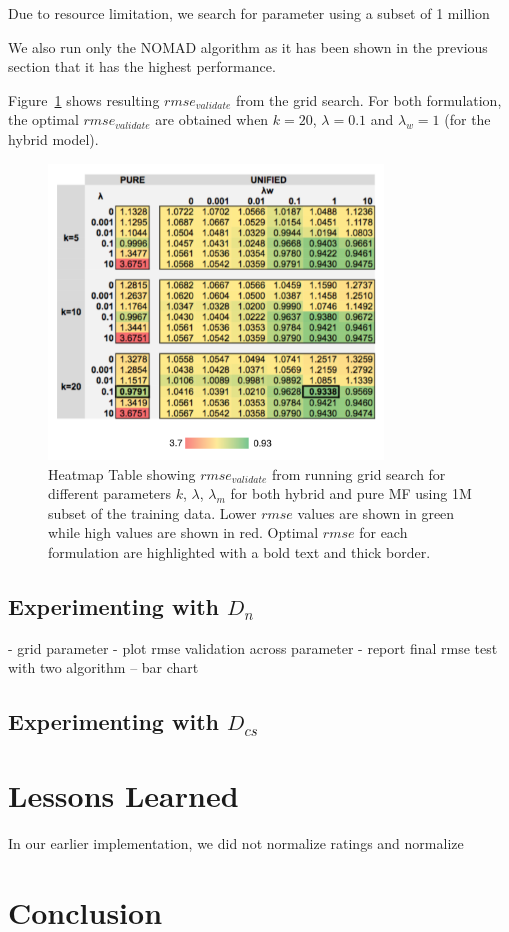 \documentclass{article} %
\begin{document}
Due to resource limitation, we search for parameter using a subset of 1 million


We also run only the NOMAD algorithm as it
has been shown in the previous section that it has the highest performance.

Figure~\ref{fig:gridsearch} shows resulting $rmse_{validate}$ from the grid search.
For both formulation, the optimal $rmse_{validate}$ are obtained when
$k=20$, $\lambda=0.1$ and $\lambda_w=1$ (for the hybrid model).

\begin{figure}[h]
\centering
\includegraphics[width=3.5in]{grid-search.png}
\caption{\label{fig:gridsearch} Heatmap Table showing $rmse_{validate}$ from
running grid search for different parameters $k$, $\lambda$, $\lambda_m$ for
both hybrid and pure MF using 1M subset of the training data.  Lower $rmse$
values are shown in green while high values are shown in red.  Optimal $rmse$
for each formulation are highlighted with a bold text and thick border.}
\end{figure}




\subsection{Experimenting with $D_n$}

- grid parameter
- plot rmse validation across parameter
- report final rmse test with two algorithm -- bar chart

\subsection{Experimenting with $D_{cs}$}



\section{Lessons Learned}

In our earlier implementation, we did not normalize ratings and normalize

\section{Conclusion}



{}
\end{document}
